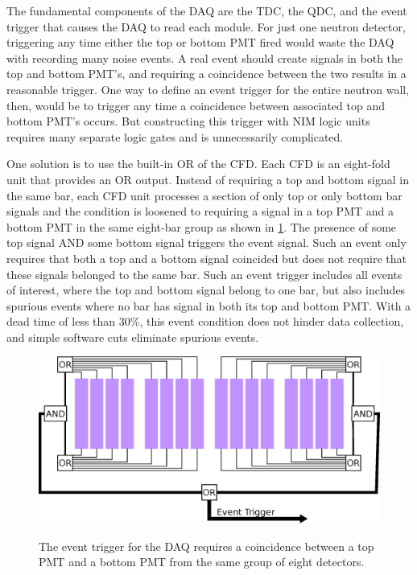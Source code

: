 The fundamental components of the DAQ are the TDC, the QDC, and the event trigger that causes the DAQ to read each module.  For just one neutron detector, triggering any time either the top or bottom PMT fired would waste the DAQ with recording many noise events.  A real event should create signals in both the top and bottom PMT's, and requiring a coincidence between the two results in a reasonable trigger.  One way to define an event trigger for the entire neutron wall, then, would be to trigger any time a coincidence between associated top and bottom PMT's occurs.  But constructing this trigger with NIM logic units requires many separate logic gates and is unnecessarily complicated.  

One solution is to use the built-in OR of the CFD.  Each CFD is an eight-fold unit that provides an OR output.  Instead of requiring a top and bottom signal in the same bar, each CFD unit processes a section of only top or only bottom bar signals and the condition is loosened to requiring a signal in a top PMT and a bottom PMT in the same eight-bar group as shown in \ref{fig:eventTrig}.  The presence of some top signal AND some bottom signal triggers the event signal.  Such an event only requires that both a top and a bottom signal coincided but does not require that these signals belonged to the same bar.  Such an event trigger includes all events of interest, where the top and bottom signal belong to one bar, but also includes spurious events where no bar has signal in both its top and bottom PMT.  With a dead time of less than 30\%, this event condition does not hinder data collection, and simple software cuts eliminate spurious events.

\begin{figure}[htp]
\centering
\includegraphics[width=1.0\textwidth]{figures/event_trigger.eps}
\label{fig:eventTrig}
\caption{The event trigger for the DAQ requires a coincidence between a top PMT and a bottom PMT from the same group of eight detectors.}
\end{figure}

